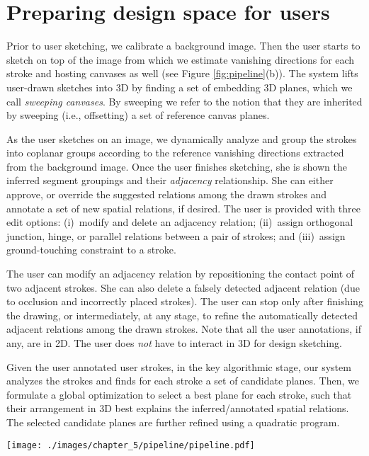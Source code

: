 \section{Preparing design space for users}

Prior to user sketching, we calibrate a background image. Then the user starts to sketch on top of the image from which we estimate vanishing directions for each stroke and hosting canvases as well (see Figure \ref{fig:pipeline}(b)). The system lifts user-drawn sketches into 3{D} by finding a set of embedding 3{D} planes, which we call \emph{sweeping canvases}. By sweeping we refer to the notion that they are inherited by sweeping (i.e., offsetting) a set of reference canvas planes.

As the user sketches on an image, we dynamically analyze and group the strokes into coplanar groups according to the reference vanishing directions extracted from the background image. Once the user finishes sketching, she is shown the inferred segment groupings and their {\em adjacency} relationship. She can either approve, or override the suggested relations among the drawn strokes and annotate a set of new spatial relations, if desired. The user is provided with three edit options: (i)~modify and delete an adjacency relation;
(ii)~assign orthogonal junction, hinge, or parallel relations between a pair of strokes; and (iii)~assign ground-touching constraint to a stroke.

%
The user can modify an adjacency relation by repositioning the contact point of two adjacent strokes. She can also delete a falsely detected adjacent relation (due to occlusion and incorrectly placed strokes). The user can stop only after finishing the drawing, or intermediately, at any stage, to refine the automatically detected adjacent relations among the drawn strokes.
Note that all the user annotations, if any, are in 2D. The user does {\em not} have to interact in 3D for design sketching.

Given the user annotated user strokes, in the key algorithmic stage, our system analyzes the strokes and finds for each stroke a set of candidate planes. Then, we formulate a global optimization to select a best plane for each stroke, such that their arrangement in 3D best explains the inferred/annotated spatial relations. The selected candidate planes are further refined using a quadratic program.

\begin{figure*}[t!]
  \texttt{[image: ./images/chapter\_5/pipeline/pipeline.pdf]}
  \caption[Design pipeline.]{Starting from a single image, the user annotates vanishing line information~(a). She continues by sketching on top of the image. We estimate the respective vanishing information for each stroke with a set of automatically grouped strokes (different colors) exposed to the user~(b). The user can modify the grouping results, or inter-stroke contact relations, then our system automatically lift a set of 3{D} canvases that host the strokes~(c).  %
  Our system dynamically infers spatial structure from the user sketches~(d).}
  \label{fig:pipeline}
\end{figure*}


